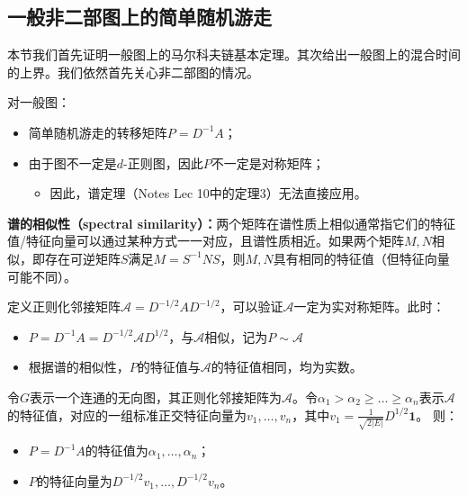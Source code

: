             


\subsection{一般非二部图上的简单随机游走}

本节我们首先证明一般图上的马尔科夫链基本定理。其次给出一般图上的混合时间的上界。我们依然首先关心非二部图的情况。

\vspace{0.2cm}
对一般图：
\begin{itemize}
    \item 简单随机游走的转移矩阵$P=D^{-1}A$；
    \item 由于图不一定是$d$-正则图，因此$P$不一定是对称矩阵；
    \begin{itemize}
        \item 因此，谱定理（Notes Lec 10中的定理3）无法直接应用。
    \end{itemize}
\end{itemize}

\vspace{0.2cm}
\textbf{谱的相似性（spectral similarity）：}两个矩阵在谱性质上相似通常指它们的特征值/特征向量可以通过某种方式一一对应，且谱性质相近。如果两个矩阵$M,N$相似，即存在可逆矩阵$S$满足$M=S^{-1}NS$，则$M,N$具有相同的特征值（但特征向量可能不同）。
            
\vspace{0.2cm}
定义正则化邻接矩阵$\mathcal{A}=D^{-1/2}AD^{-1/2}$，可以验证$\mathcal{A}$一定为实对称矩阵。此时：
\begin{itemize}
    \item $P=D^{-1}A=D^{-1/2}\mathcal{A}D^{1/2}$，与$\mathcal{A}$相似，记为$P\sim \mathcal{A}$
    \item 根据谱的相似性，$P$的特征值与$\mathcal{A}$的特征值相同，均为实数。
\end{itemize}

\begin{lemma}
    \label{lemma:similarity-P}
    令$G$表示一个连通的无向图，其正则化邻接矩阵为$\mathcal{A}$。令$\alpha_1>\alpha_2\ge \dots\ge \alpha_n$表示$\mathcal{A}$的特征值，对应的一组标准正交特征向量为$v_1,\dots,v_n$，其中$v_1=\frac{1}{\sqrt{2|E|}}D^{1/2}\bm{1}$。
    则：
    \begin{itemize}
        \item $P=D^{-1}A$的特征值为$\alpha_1,\dots,\alpha_n$；
        \item $P$的特征向量为$D^{-1/2}v_1,\dots,D^{-1/2}v_n$。
    \end{itemize}
\end{lemma}

